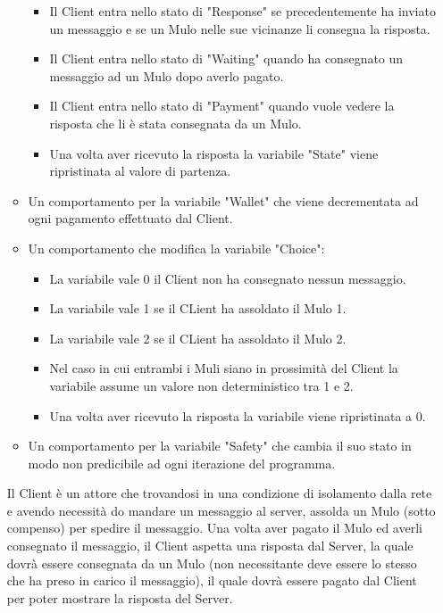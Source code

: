 \documentclass[13pt,a4paper]{article}
\begin{document}
\begin{itemize}
\begin{itemize}
\begin{itemize}
			\item Il Client entra nello stato di "Response" se precedentemente ha inviato un messaggio e se un Mulo nelle sue vicinanze li consegna la risposta.
			\item Il Client entra nello stato di "Waiting" quando ha consegnato un messaggio ad un Mulo dopo averlo pagato. 
			\item Il Client entra nello stato di "Payment" quando vuole vedere la risposta che li è stata consegnata da un Mulo.
			\item Una volta aver ricevuto la risposta la variabile "State" viene ripristinata al valore di partenza.
		\end{itemize}
		\item Un comportamento per la variabile "Wallet" che viene decrementata ad ogni pagamento effettuato dal Client.
		\item Un comportamento che modifica la variabile "Choice":
		\begin{itemize}
			\item La variabile vale 0 il Client non ha consegnato nessun messaggio.
			\item La variabile vale 1 se  il CLient ha assoldato il Mulo 1.
			\item La variabile vale 2 se  il CLient ha assoldato il Mulo 2.
			\item Nel caso in cui entrambi i Muli siano in prossimità del Client la variabile assume un valore non deterministico tra 1 e 2.
			\item Una volta aver ricevuto la risposta la variabile viene ripristinata a 0.
		\end{itemize}
	\item Un comportamento per la variabile "Safety" che cambia il suo stato in modo non predicibile ad ogni iterazione del programma.
	\end{itemize}
	Il Client  è un attore che trovandosi in una condizione di isolamento dalla rete e avendo necessità do mandare un messaggio al server, assolda un Mulo (sotto compenso) per spedire il messaggio. Una volta aver pagato il Mulo ed averli consegnato il messaggio, il Client aspetta una risposta dal Server, la quale dovrà essere consegnata da un Mulo (non necessitante deve essere lo stesso che ha preso in carico il messaggio), il quale dovrà essere pagato dal Client per poter mostrare la risposta del Server.
	

\end{itemize}
\end{document}
